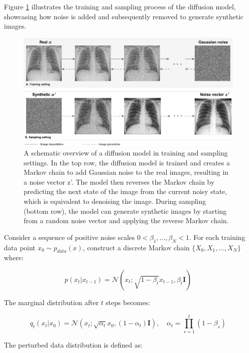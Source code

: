 \documentclass{article}
\begin{document}
Figure \ref{fig:diffusion_model_architecture} illustrates the training and sampling process of the diffusion model, showcasing how noise is added and subsequently removed to generate synthetic images.

\begin{figure}[htb]
    \centering
    \includegraphics[width=0.98\linewidth]{images/diffusion_model.pdf}
    \caption{A schematic overview of a diffusion model in training and sampling settings. In the top row, the diffusion model is trained and creates a Markov chain to add Gaussian noise to the real images, resulting in a noise vector z’. The model then reverses the Markov chain by predicting the next state of the image from the current noisy state, which is equivalent to denoising the image. During sampling (bottom row), the model can generate synthetic images by starting from a random noise vector and applying the reverse Markov chain.}
    \label{fig:diffusion_model_architecture}
\end{figure}

Consider a sequence of positive noise scales $0 < \beta_1, \dots, \beta_N < 1$. For each training data point $x_0 \sim p_{data}(x)$, construct a discrete Markov chain $\{X_0, X_1, \dots, X_N\}$ where:

\begin{equation}
p(x_t|x_{t-1}) = \mathcal{N}(x_t; \sqrt{1-\beta_t}x_{t-1}, \beta_t\mathbf{I})
\end{equation}

The marginal distribution after $t$ steps becomes:

\begin{equation}
q_t(x_t|x_0) = \mathcal{N}(x_t; \sqrt{\alpha_t}x_0, (1-\alpha_t)\mathbf{I}), \quad \alpha_t = \prod_{s=1}^t (1-\beta_s)
\end{equation}

The perturbed data distribution is defined as:
\end{document}
